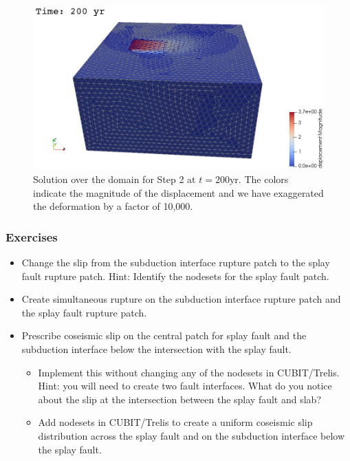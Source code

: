 \begin{figure}
  \includegraphics[width=5.0in]{examples/figs/subduction3d_step02_soln}
  \caption{Solution over the domain for Step 2 at $t = 200 \mathrm{yr}$. The
    colors indicate the magnitude of the displacement and we have
    exaggerated the deformation by a factor of 10,000.}
  \label{fig:example:subduction:3d:step02}
\end{figure}


\subsubsection{Exercises}

\begin{itemize}
\item Change the slip from the subduction interface rupture patch to
  the splay fault rupture patch. Hint: Identify the nodesets for the
  splay fault patch.
\item Create simultaneous rupture on the subduction interface rupture
  patch and the splay fault rupture patch.
\item Prescribe coseismic slip on the central patch for splay fault
  and the subduction interface below the intersection with the splay fault.
  \begin{itemize}
  \item Implement this without changing any of the nodesets in
    CUBIT/Trelis. Hint: you will need to create two fault
    interfaces. What do you notice about the slip at the intersection
    between the splay fault and slab?
  \item Add nodesets in CUBIT/Trelis to create a uniform coseismic
    slip distribution across the splay fault and on the subduction interface
    below the splay fault.
  \end{itemize}
\end{itemize}


